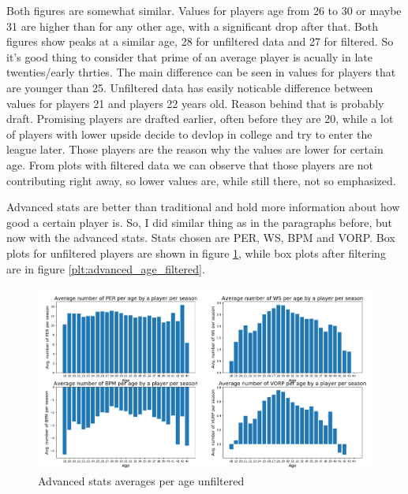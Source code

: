 \documentclass[a4paper]{article}
\begin{document}
Both figures are somewhat similar. Values for players age from 26 to 30 or maybe 31 are higher than for any other age, with a significant drop after that. Both figures show peaks at a similar age, 28 for unfiltered data and 27 for filtered. So it's good thing to consider that prime of an average player is acually in late twenties/early thrties. The main difference can be seen in values for players that are younger than 25. Unfiltered data has easily noticable difference between values for players 21 and players 22 years old. Reason behind that is probably draft. Promising players are drafted earlier, often before they are 20, while a lot of players with lower upside decide to devlop in college and try to enter the league later. Those players are the reason why the values are lower for certain age. From plots with filtered data we can observe that those players are not contributing right away, so lower values are, while still there, not so emphasized.

Advanced stats are better than traditional and hold more information about how good a certain player is. So, I did similar thing as in the paragraphs before, but now with the advanced stats. Stats chosen are PER, WS, BPM and VORP. Box plots for unfiltered players are shown in figure \ref{plt:advanced_age}, while box plots after filtering are in figure \ref{plt:advanced_age_filtered}.


\begin{figure}[h!]
\begin{center}
\includegraphics[scale=0.3]{advanced_stats_per_age.png}
\end{center}
\caption{Advanced stats averages per age unfiltered}
\label{plt:advanced_age}
\end{figure}
\end{document}
